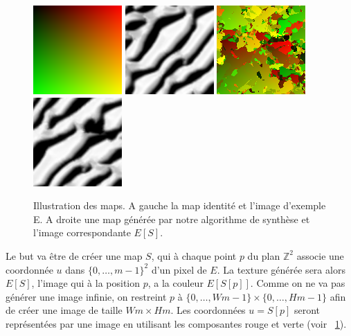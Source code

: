 \documentclass[12pt]{article}
\newcommand{\Z}{\mathbb{Z}}
\begin{document}
\begin{figure}[t]
	\centering
	\includegraphics[scale=2.5]{S0.png}
	\includegraphics[scale=2.5]{E0.png}
	\qquad \qquad
	\includegraphics[scale=2.5]{S1.png}
	\includegraphics[scale=2.5]{E1.png}
	\captionsetup{justification=centering}
	\caption{Illustration des maps. A gauche la map identité et l'image d'exemple E. A droite une map générée par notre algorithme de synthèse et l'image correspondante $E[S]$.}
	\label{map_illu}
\end{figure}

Le but va être de créer une map $S$, qui à chaque point $p$ du plan $\Z^2$ associe une coordonnée $u$ dans $\{ 0, \dots, m-1 \}^2$ d'un pixel de $E$. La texture générée sera alors $E[S]$, l'image qui à la position $p$, a la couleur $E[S[p]]$. Comme on ne va pas générer une image infinie, on restreint $p$ à $\{ 0, \dots, Wm-1 \} \times \{ 0, \dots, Hm-1 \}$ afin de créer une image de taille $Wm \times Hm$. Les coordonnées $u = S[p]$ seront représentées par une image en utilisant les composantes rouge et verte (voir \figurename~\ref{map_illu}).
\end{document}
